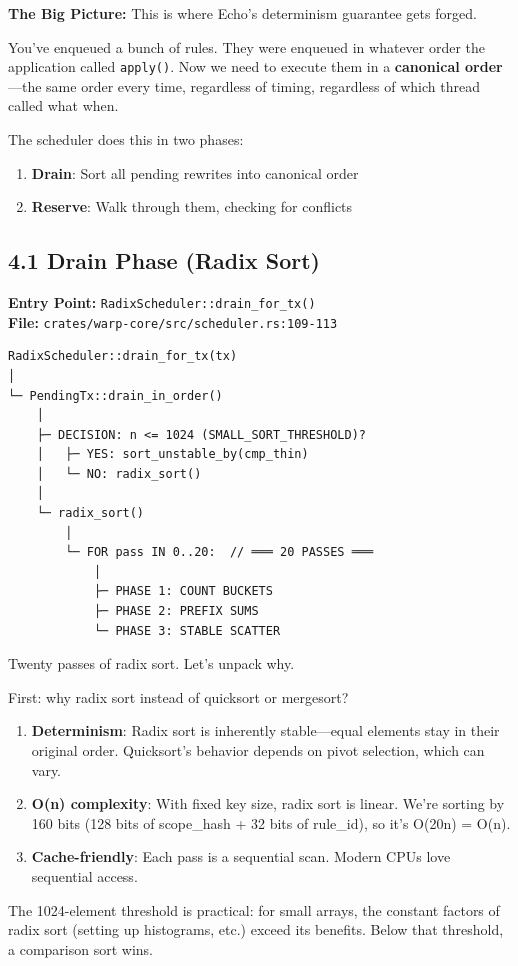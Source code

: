 \documentclass[11pt]{book}
\newenvironment{directors}
{\begin{mdframed}[
  linecolor=blue!60,
  linewidth=2pt,
  leftline=true,
  rightline=false,
  topline=false,
  bottomline=false,
  backgroundcolor=blue!3,
  innerleftmargin=12pt,
  innerrightmargin=10pt,
  innertopmargin=8pt,
  innerbottommargin=8pt,
  skipabove=12pt,
  skipbelow=12pt
]\small\sffamily\color{blue!70!black}}
{\end{mdframed}}
\newenvironment{bigpicture}
{\begin{mdframed}[
  linecolor=purple!60,
  linewidth=2pt,
  leftline=true,
  rightline=false,
  topline=false,
  bottomline=false,
  backgroundcolor=purple!3,
  innerleftmargin=12pt,
  innerrightmargin=10pt,
  innertopmargin=8pt,
  innerbottommargin=8pt,
  skipabove=12pt,
  skipbelow=12pt
]\small\sffamily\color{purple!70!black}\textbf{The Big Picture:} }
{\end{mdframed}}
\begin{document}
\begin{bigpicture}
This is where Echo's determinism guarantee gets forged.

You've enqueued a bunch of rules. They were enqueued in whatever order the application called \texttt{apply()}. Now we need to execute them in a \textbf{canonical order}---the same order every time, regardless of timing, regardless of which thread called what when.

The scheduler does this in two phases:
\begin{enumerate}
\item \textbf{Drain}: Sort all pending rewrites into canonical order
\item \textbf{Reserve}: Walk through them, checking for conflicts
\end{enumerate}
\end{bigpicture}

\subsection{4.1 Drain Phase (Radix Sort)}

\textbf{Entry Point:} \texttt{RadixScheduler::drain\_for\_tx()} \\
\textbf{File:} \texttt{crates/warp-core/src/scheduler.rs:109-113}

\begin{verbatim}
RadixScheduler::drain_for_tx(tx)
│
└─ PendingTx::drain_in_order()
    │
    ├─ DECISION: n <= 1024 (SMALL_SORT_THRESHOLD)?
    │   ├─ YES: sort_unstable_by(cmp_thin)
    │   └─ NO: radix_sort()
    │
    └─ radix_sort()
        │
        └─ FOR pass IN 0..20:  // ═══ 20 PASSES ═══
            │
            ├─ PHASE 1: COUNT BUCKETS
            ├─ PHASE 2: PREFIX SUMS
            └─ PHASE 3: STABLE SCATTER
\end{verbatim}

\begin{directors}
Twenty passes of radix sort. Let's unpack why.

First: why radix sort instead of quicksort or mergesort?

\begin{enumerate}
\item \textbf{Determinism}: Radix sort is inherently stable---equal elements stay in their original order. Quicksort's behavior depends on pivot selection, which can vary.

\item \textbf{O(n) complexity}: With fixed key size, radix sort is linear. We're sorting by 160 bits (128 bits of scope\_hash + 32 bits of rule\_id), so it's O(20n) = O(n).

\item \textbf{Cache-friendly}: Each pass is a sequential scan. Modern CPUs love sequential access.
\end{enumerate}

The 1024-element threshold is practical: for small arrays, the constant factors of radix sort (setting up histograms, etc.) exceed its benefits. Below that threshold, a comparison sort wins.
\end{directors}
\end{document}
